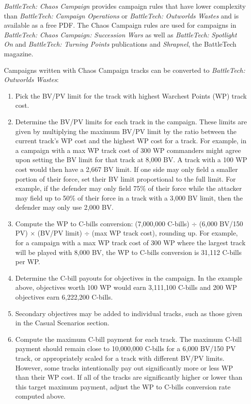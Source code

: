 \emph{BattleTech: Chaos Campaign} provides campaign rules that have lower complexity than \emph{BattleTech: Campaign Operations} or \emph{BattleTech: Outworlds Wastes} and is available as a free PDF.
The Chaos Campaign rules are used for campaigns in \emph{BattleTech: Chaos Campaign: Succession Wars} as well as \emph{BattleTech: Spotlight On} and \emph{BattleTech: Turning Points} publications and \emph{Shrapnel}, the BattleTech magazine.

Campaigns written with Chaos Campaign tracks can be converted to \emph{BattleTech: Outworlds Wastes}:

\begin{enumerate}

\item Pick the BV/PV limit for the track with highest Warchest Points (WP) track cost.

\item Determine the BV/PV limits for each track in the campaign.
These limits are given by multiplying the maximum BV/PV limit by the ratio between the current track's WP cost and the highest WP cost for a track.
For example, in a campaign with a max WP track cost of 300 WP commanders might agree upon setting the BV limit for that track at 8,000 BV.
A track with a 100 WP cost would then have a 2,667 BV limit.
If one side may only field a smaller portion of their force, set their BV limit proportional to the full limit.
For example, if the defender may only field 75\% of their force while the attacker may field up to 50\% of their force in a track with a 3,000 BV limit, then the defender may only use 2,000 BV.

\item Compute the WP to C-bills conversion: (7,000,000 C-bills) $\div$ (6,000 BV/150 PV) $\times$ (BV/PV limit) $\div$ (max WP track cost), rounding up.
For example, for a campaign with a max WP track cost of 300 WP where the largest track will be played with 8,000 BV, the WP to C-bills conversion is 31,112 C-bills per WP.
\item Determine the C-bill payouts for objectives in the campaign.
In the example above, objectives worth 100 WP would earn 3,111,100 C-bills and 200 WP objectives earn 6,222,200 C-bills.

\item Secondary objectives may be added to individual tracks, such as those given in the Casual Scenarios section.

\item Compute the maximum C-bill payment for each track.
The maximum C-bill payment should remain close to 10,000,000 C-bills for a 6,000 BV/150 PV track, or appropriately scaled for a track with different BV/PV limits.
However, some tracks intentionally pay out significantly more or less WP than their WP cost.
If all of the tracks are significantly higher or lower than this target maximum payment, adjust the WP to C-bills conversion rate computed above.


\end{enumerate}
